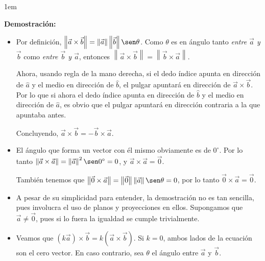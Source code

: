 \documentclass[12pt, fleqn]{report}                             %
\newenvironment{SmallIndentation}[1][0.75em]                    %
        {\begin{adjustwidth}{#1}{}\begin{footnotesize}}             %
        {\end{footnotesize}\end{adjustwidth}}                       %
\theoremstyle{break}                                            %
\newcommand{\Wrap}[1]{\left( #1 \right)}                        %
\newcommand{\Abs}[1]{\left\lVert #1 \right\lVert}               %
\begin{document}
            \begin{SmallIndentation}[1em]
                \textbf{Demostración:}
                \begin{itemize}\setlength\itemsep{0em}
                    \item Por definición, $\Abs{\vec{a} \times \vec{b}} = \Abs{\vec{a}} \Abs{\vec{b}} \sen \theta$. Como $\theta$ es en ángulo tanto \emph{entre $\vec{a}$ y $\vec{b}$} como \emph{entre $\vec{b}$ y $\vec{a}$}, entonces $\Abs{\vec{a} \times \vec{b}} = \Abs{\vec{b} \times \vec{a}}$.
                    
                    Ahora, usando regla de la mano derecha, si el dedo índice apunta en dirección de $\hat{a}$ y el medio en dirección de $\hat{b}$, el pulgar apuntará en dirección de $\vec{a} \times \vec{b}$. Por lo que si ahora el dedo índice apunta en dirección de $\hat{b}$ y el medio en dirección de $\hat{a}$, es obvio que el pulgar apuntará en dirección contraria a la que apuntaba antes.
                    
                    Concluyendo, $\vec{a} \times \vec{b} = -\vec{b} \times \vec{a}$.
                    
                    \item El ángulo que forma un vector con él mismo obviamente es de $0^\circ$. Por lo tanto $\Abs{\vec{a} \times \vec{a}} = \Abs{\vec{a}}^2 \sen 0^\circ = 0$, y $\vec{a} \times \vec{a} = \vec{0}$.
                    
                    También tenemos que $\Abs{\vec{0} \times \vec{a}} = \Abs{\vec{0}} \Abs{\vec{a}} \sen \theta=0$, por lo tanto $\vec{0} \times \vec{a} = \vec{0}$.
                    
                    \item A pesar de su simplicidad para entender, la demostración no es tan sencilla, pues involucra el uso de planos y proyecciones en ellos. Supongamos que $\vec{a} \neq \vec{0}$, pues si lo fuera la igualdad se cumple trivialmente.
                    
                    \item Veamos que $\Wrap{k \vec{a}} \times \vec{b} = k\Wrap{\vec{a} \times \vec{b}}$. Si $k=0$, ambos lados de la ecuación son el cero vector. En caso contrario, sea $\theta$ el ángulo entre $\vec{a}$ y $\vec{b}$.
                    

\end{itemize}
\end{SmallIndentation}
\end{document}
